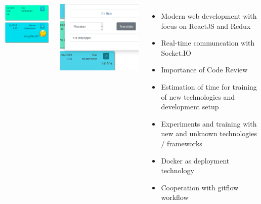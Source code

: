 \documentclass[20pt, a1paper]{tikzposter}
\begin{document}
\begin{columns}
{		\begin{minipage}[t][6cm]{0.5\linewidth}
			\begin{tikzfigure}
				\includegraphics[scale=1.3]{chat-single.png}
			\end{tikzfigure}
		\end{minipage}		
		\begin{minipage}[t][6cm]{0.5\linewidth}
			\begin{tikzfigure}
				\includegraphics[scale=0.9]{chat-translation.png}
			\end{tikzfigure}
		
		\end{minipage}
		\vspace{3cm}
	}

	{
		\begin{itemize}
			\item Modern web development with focus on ReactJS and Redux
			\item Real-time communcation with Socket.IO
			\item Importance of Code Review
			\item Estimation of time for training of new technologies and development setup
			\item Experiments and training with new and unknown technologies / frameworks
			\item Docker as deployment technology
			\item Cooperation with gitflow workflow
		\end{itemize}
	}

	\end{columns}

	

	
\end{document}
